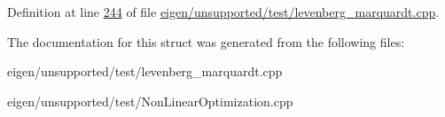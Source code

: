 Definition at line \hyperlink{eigen_2unsupported_2test_2levenberg__marquardt_8cpp_source_l00244}{244} of file \hyperlink{eigen_2unsupported_2test_2levenberg__marquardt_8cpp_source}{eigen/unsupported/test/levenberg\+\_\+marquardt.\+cpp}.



The documentation for this struct was generated from the following files\+:\begin{DoxyCompactItemize}
\item 
eigen/unsupported/test/levenberg\+\_\+marquardt.\+cpp\item 
eigen/unsupported/test/\+Non\+Linear\+Optimization.\+cpp\end{DoxyCompactItemize}
